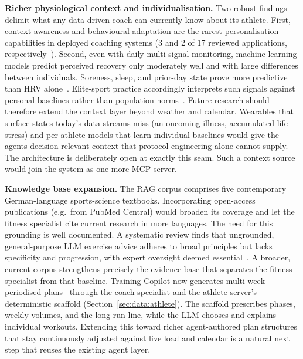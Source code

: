 \textbf{Richer physiological context and individualisation.} Two robust findings delimit what any data-driven coach can currently know about its athlete. First, context-awareness and behavioural adaptation are the rarest personalisation capabilities in deployed coaching systems (3 and 2 of 17 reviewed applications, respectively~\citep{monteiro-guerra_personalization_2020}). Second, even with daily multi-signal monitoring, machine-learning models predict perceived recovery only moderately well and with large differences between individuals. Soreness, sleep, and prior-day state prove more predictive than HRV alone~\citep{rothschild_predicting_2024}. Elite-sport practice accordingly interprets such signals against personal baselines rather than population norms~\citep{plews_training_2013}. Future research should therefore extend the context layer beyond weather and calendar. Wearables that surface states today's data streams miss (an oncoming illness, accumulated life stress) and per-athlete models that learn individual baselines would give the agents decision-relevant context that protocol engineering alone cannot supply. The architecture is deliberately open at exactly this seam. Such a context source would join the system as one more MCP server.

\textbf{Knowledge base expansion.} The RAG corpus comprises five contemporary German-language sports-science textbooks. Incorporating open-access publications (e.g.\ from PubMed Central) would broaden its coverage and let the fitness specialist cite current research in more languages. The need for this grounding is well documented. A systematic review finds that ungrounded, general-purpose LLM exercise advice adheres to broad principles but lacks specificity and progression, with expert oversight deemed essential~\citep{puce_harnessing_2025}. A broader, current corpus strengthens precisely the evidence base that separates the fitness specialist from that baseline. Training Copilot now generates multi-week periodised plans~\citep{grgic_periodization_2017} through the coach specialist and the athlete server's deterministic scaffold (Section~\ref{sec:data:athlete}). The scaffold prescribes phases, weekly volumes, and the long-run line, while the LLM chooses and explains individual workouts. Extending this toward richer agent-authored plan structures that stay continuously adjusted against live load and calendar is a natural next step that reuses the existing agent layer.

